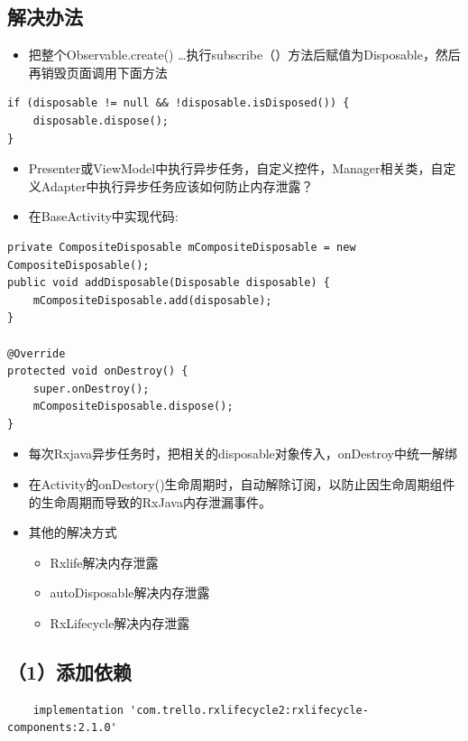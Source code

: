\documentclass[9pt, b5paper]{article}
\begin{document}
\subsection{解决办法}
\label{sec-19-2}
\begin{itemize}
\item 把整个Observable.create() \ldots{}执行subscribe（）方法后赋值为Disposable，然后再销毁页面调用下面方法
\end{itemize}
\begin{verbatim}
if (disposable != null && !disposable.isDisposed()) {
    disposable.dispose();
}
\end{verbatim}
\begin{itemize}
\item Presenter或ViewModel中执行异步任务，自定义控件，Manager相关类，自定义Adapter中执行异步任务应该如何防止内存泄露？
\item 在BaseActivity中实现代码:
\end{itemize}
\begin{verbatim}
private CompositeDisposable mCompositeDisposable = new CompositeDisposable();
public void addDisposable(Disposable disposable) {
    mCompositeDisposable.add(disposable);
}

@Override
protected void onDestroy() {
    super.onDestroy();
    mCompositeDisposable.dispose();
}
\end{verbatim}
\begin{itemize}
\item 每次Rxjava异步任务时，把相关的disposable对象传入，onDestroy中统一解绑
\item 在Activity的onDestory()生命周期时，自动解除订阅，以防止因生命周期组件的生命周期而导致的RxJava内存泄漏事件。
\item 其他的解决方式
\begin{itemize}
\item Rxlife解决内存泄露
\item autoDisposable解决内存泄露
\item RxLifecycle解决内存泄露
\end{itemize}
\end{itemize}

\subsection{（1）添加依赖}
\label{sec-19-3}
\begin{verbatim}
    implementation 'com.trello.rxlifecycle2:rxlifecycle-components:2.1.0'
\end{verbatim}
\end{document}
